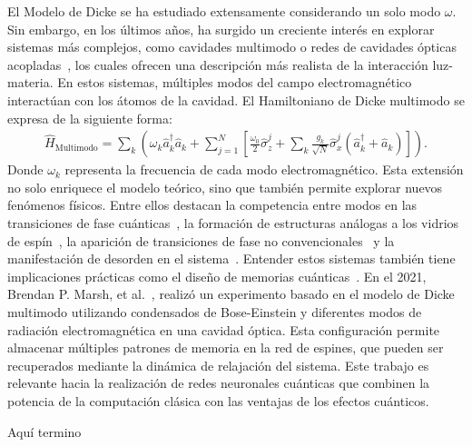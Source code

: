 \documentclass[onecolumn,notitlepage,letterpaper,aps,pra,12pt]{article}
\numberwithin{equation}{section}
\newcommand{\ricardo}[1]{{\color{red}#1}}
\begin{document}
El Modelo de Dicke se ha estudiado extensamente considerando un solo modo $\omega$. %
Sin embargo, en los últimos años, ha surgido un creciente interés en explorar sistemas más complejos, como cavidades multimodo o redes de cavidades ópticas acopladas~\cite{tolkunov2007,fiorelli2020,carollo2021}, los cuales ofrecen una descripción más realista de la interacción luz-materia. En estos sistemas, múltiples modos del campo electromagnético interactúan con los átomos de la cavidad. El Hamiltoniano de Dicke multimodo se expresa de la siguiente forma:
\begin{gather}
        \hat{H}_{\text{Multimodo}} = \sum_{k}\left(\omega_{k}\hat{a}^{\dagger}_{k}\hat{a}_{k} + \sum_{j=1}^{N}\left[ \frac{\omega_{0}}{2}\hat{\sigma}_{z}^{j} + \sum_{k}\frac{g_{k}}{\sqrt{N}}\hat{\sigma}_{x}^{j}\left(\hat{a}^{\dagger}_{k} + \hat{a}_{k}\right) \right]\right).
\end{gather}
Donde $\omega_{k}$ representa la frecuencia de cada modo electromagnético. Esta extensión no solo enriquece el modelo teórico, sino que también permite explorar nuevos fenómenos físicos. Entre ellos destacan la competencia entre modos en las transiciones de fase cuánticas~\cite{tolkunov2007}, la formación de estructuras análogas a los vidrios de espín~\cite{rotondo2015}, la aparición de transiciones de fase no convencionales~\cite{kipf2014} y la manifestación de desorden en el sistema~\cite{vojta2013,das2024}.
Entender estos sistemas también tiene implicaciones prácticas como el diseño de memorias cuánticas~\cite{fiorelli2020}.  En el 2021, Brendan P. Marsh, et al.~\cite{marsch2021}, realizó un experimento basado en el modelo de Dicke multimodo utilizando condensados de Bose-Einstein y diferentes modos de radiación electromagnética en una cavidad óptica. %
Esta configuración permite almacenar múltiples patrones de memoria en la red de espines, que pueden ser recuperados mediante la dinámica de relajación del sistema. Este trabajo es relevante hacia la realización de redes neuronales cuánticas que combinen la potencia de la computación clásica con las ventajas de los efectos cuánticos. 

\ricardo{Aquí termino}
\end{document}
